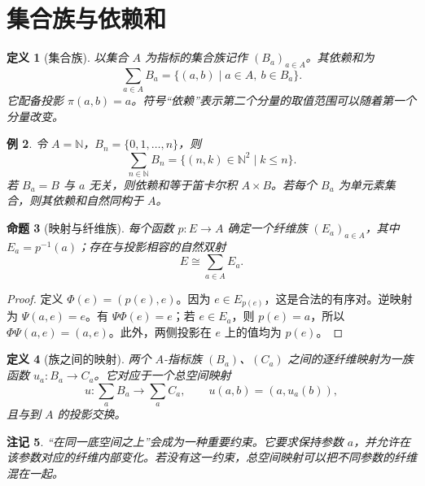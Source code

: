 \documentclass[12pt,oneside,openany,fontset=none]{ctexbook}
\theoremstyle{cn}
\newtheorem{definition}{定义}[chapter]
\newtheorem{example}[definition]{例}
\newtheorem{proposition}[definition]{命题}
\newtheorem{remark}[definition]{注记}
\numberwithin{equation}{chapter}
\newcommand{\N}{\mathbb N}
\begin{document}
\section{集合族与依赖和}
\begin{definition}[集合族]
以集合 $A$ 为指标的集合族记作 $(B_a)_{a\in A}$。其依赖和为
\[
\sum_{a\in A}B_a=\{(a,b)\mid a\in A,\ b\in B_a\}.
\]
它配备投影 $\pi(a,b)=a$。符号“依赖”表示第二个分量的取值范围可以随着第一个分量改变。
\end{definition}
\begin{example}
令 $A=\N$，$B_n=\{0,1,\ldots,n\}$，则
\[
\sum_{n\in\N} B_n=\{(n,k)\in\N^2\mid k\le n\}.
\]
若 $B_a=B$ 与 $a$ 无关，则依赖和等于笛卡尔积 $A\times B$。若每个 $B_a$ 为单元素集合，则其依赖和自然同构于 $A$。
\end{example}
\begin{proposition}[映射与纤维族]
每个函数 $p:E\to A$ 确定一个纤维族 $(E_a)_{a\in A}$，其中 $E_a=p^{-1}(a)$；存在与投影相容的自然双射
\[
E\cong\sum_{a\in A} E_a.
\]
\end{proposition}
\begin{proof}
定义 $\Phi(e)=(p(e),e)$。因为 $e\in E_{p(e)}$，这是合法的有序对。逆映射为 $\Psi(a,e)=e$。有 $\Psi\Phi(e)=e$；若 $e\in E_a$，则 $p(e)=a$，所以 $\Phi\Psi(a,e)=(a,e)$。此外，两侧投影在 $e$ 上的值均为 $p(e)$。
\end{proof}
\begin{definition}[族之间的映射]
两个 $A$-指标族 $(B_a)$、$(C_a)$ 之间的逐纤维映射为一族函数 $u_a:B_a\to C_a$。它对应于一个总空间映射
\[
u:\sum_a B_a\longrightarrow\sum_a C_a,
\qquad u(a,b)=(a,u_a(b)),
\]
且与到 $A$ 的投影交换。
\end{definition}
\begin{remark}
“在同一底空间之上”会成为一种重要约束。它要求保持参数 $a$，并允许在该参数对应的纤维内部变化。若没有这一约束，总空间映射可以把不同参数的纤维混在一起。
\end{remark}
\end{document}
